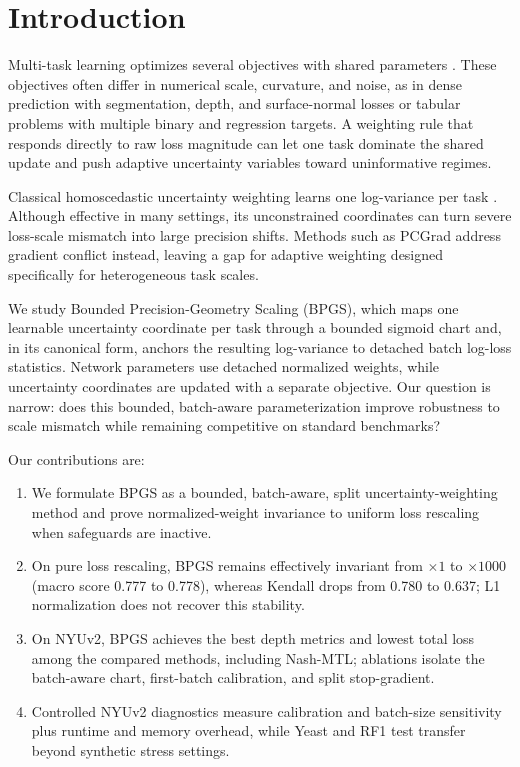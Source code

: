 \section{Introduction}
Multi-task learning optimizes several objectives with shared parameters \cite{caruana1997multitask}. These objectives often differ in numerical scale, curvature, and noise, as in dense prediction with segmentation, depth, and surface-normal losses or tabular problems with multiple binary and regression targets. A weighting rule that responds directly to raw loss magnitude can let one task dominate the shared update and push adaptive uncertainty variables toward uninformative regimes.

Classical homoscedastic uncertainty weighting learns one log-variance per task \cite{kendall2018}. Although effective in many settings, its unconstrained coordinates can turn severe loss-scale mismatch into large precision shifts. Methods such as PCGrad \cite{yu2020pcgrad} address gradient conflict instead, leaving a gap for adaptive weighting designed specifically for heterogeneous task scales.

We study Bounded Precision-Geometry Scaling (BPGS), which maps one learnable uncertainty coordinate per task through a bounded sigmoid chart and, in its canonical form, anchors the resulting log-variance to detached batch log-loss statistics. Network parameters use detached normalized weights, while uncertainty coordinates are updated with a separate objective. Our question is narrow: does this bounded, batch-aware parameterization improve robustness to scale mismatch while remaining competitive on standard benchmarks?

Our contributions are:
\begin{enumerate}[leftmargin=1.25em]
\item We formulate BPGS as a bounded, batch-aware, split uncertainty-weighting method and prove normalized-weight invariance to uniform loss rescaling when safeguards are inactive.
\item On pure loss rescaling, BPGS remains effectively invariant from $\times 1$ to $\times 1000$ (macro score 0.777 to 0.778), whereas Kendall drops from 0.780 to 0.637; L1 normalization does not recover this stability.
\item On NYUv2, BPGS achieves the best depth metrics and lowest total loss among the compared methods, including Nash-MTL; ablations isolate the batch-aware chart, first-batch calibration, and split stop-gradient.
\item Controlled NYUv2 diagnostics measure calibration and batch-size sensitivity plus runtime and memory overhead, while Yeast and RF1 test transfer beyond synthetic stress settings.
\end{enumerate}
